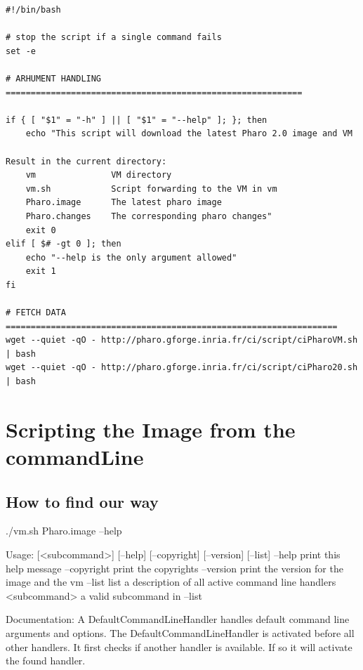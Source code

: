 \documentclass[a4paper,10pt,twoside]{book}
\begin{document}
\begin{scriptsize}
\begin{verbatim}
#!/bin/bash

# stop the script if a single command fails
set -e 

# ARHUMENT HANDLING ===========================================================

if { [ "$1" = "-h" ] || [ "$1" = "--help" ]; }; then
    echo "This script will download the latest Pharo 2.0 image and VM

Result in the current directory:
    vm               VM directory
    vm.sh            Script forwarding to the VM in vm
    Pharo.image      The latest pharo image
    Pharo.changes    The corresponding pharo changes"
    exit 0
elif [ $# -gt 0 ]; then
    echo "--help is the only argument allowed"
    exit 1
fi

# FETCH DATA ==================================================================
wget --quiet -qO - http://pharo.gforge.inria.fr/ci/script/ciPharoVM.sh | bash
wget --quiet -qO - http://pharo.gforge.inria.fr/ci/script/ciPharo20.sh | bash
\end{verbatim}
\end{scriptsize}

\section{Scripting the Image from the commandLine}


\subsection{How to find our way}

\begin{code}{}
./vm.sh Pharo.image --help
\end{code}

\begin{code}{}
Usage: [<subcommand>] [--help] [--copyright] [--version] [--list]
	--help       print this help message
	--copyright  print the copyrights
	--version    print the version for the image and the vm
	--list       list a description of all active command line handlers
	<subcommand> a valid subcommand in --list
	
Documentation:
A DefaultCommandLineHandler handles default command line arguments and options.
The DefaultCommandLineHandler is activated before all other handlers. 
It first checks if another handler is available. If so it will activate the found handler.
\end{code}
\end{document}
